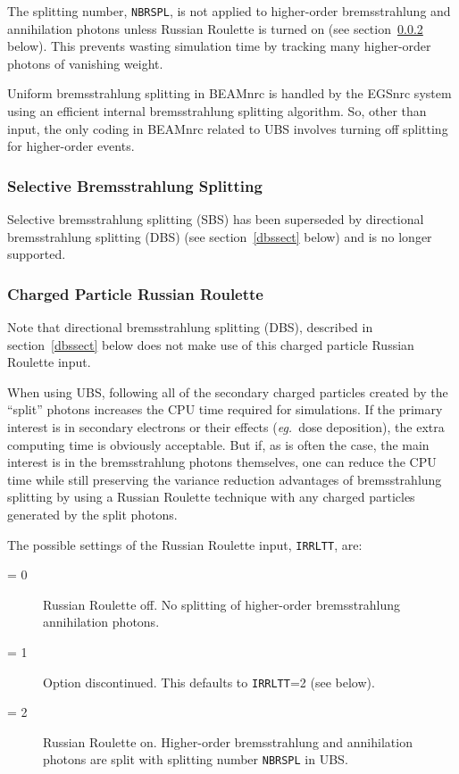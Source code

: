 \documentclass[12pt,twoside]{article}
\newcommand{\eg}{{\em eg.}}
\begin{document}
The splitting number, {\tt NBRSPL}, is not applied to
higher-order bremsstrahlung and annihilation photons unless
Russian Roulette is turned on (see section~\ref{rusrousect}
below).  This prevents wasting simulation time by tracking many
higher-order photons of vanishing weight.

Uniform bremsstrahlung splitting in BEAMnrc is handled by the EGSnrc
system using an efficient internal bremsstrahlung splitting algorithm.
So, other than input, the only coding in BEAMnrc related
to UBS involves turning off splitting for higher-order events.

\subsubsection{Selective Bremsstrahlung Splitting}
\label{sbssect}

Selective bremsstrahlung splitting (SBS) has been superseded by
directional bremsstrahlung splitting (DBS) (see section~\ref{dbssect} below) and is no longer
supported.

\subsubsection{Charged Particle Russian Roulette}
\label{rusrousect}

Note that directional bremsstrahlung splitting (DBS), described in
section~\ref{dbssect} below does not make use of this
charged particle Russian Roulette input.

When using UBS, following all of the secondary charged particles
created by the
``split'' photons increases
the CPU time required for simulations.
If the primary interest is in
secondary electrons or their effects (\eg\ dose deposition), the extra
computing time is obviously acceptable.  But if, as is often the case, the
main interest is in the bremsstrahlung photons themselves, one can reduce
the CPU time while still preserving the variance reduction advantages of
bremsstrahlung splitting by using a Russian Roulette technique with any
charged particles generated by the split photons.

The possible settings of the Russian Roulette input, {\tt IRRLTT}, are:

\begin{description}
\item[= 0] Russian Roulette off.  No splitting of higher-order
           bremsstrahlung annihilation photons.
\item[= 1] Option discontinued.  This defaults to {\tt IRRLTT}=2 (see below).
\item[= 2] Russian Roulette on.  Higher-order
           bremsstrahlung and annihilation photons are split
           with splitting number {\tt NBRSPL} in UBS.
\end{description}
\end{document}
